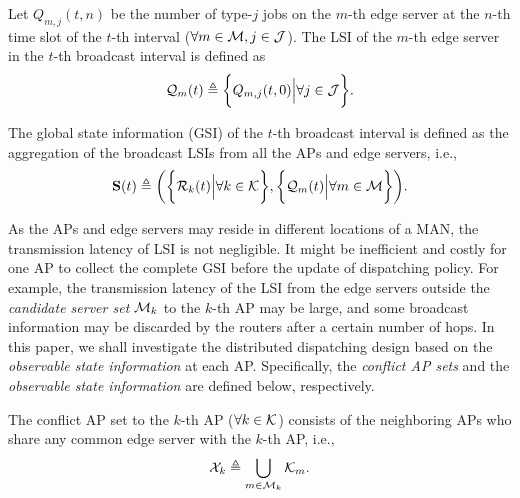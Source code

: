 \begin{definition}
    Let $Q_{m,j}({t,n})$ be the number of type-$j$ jobs on the $m$-th edge server at the $n$-th time slot of the $t$-th interval ($\forall m\in\mathcal{M}, j\in\mathcal{J}$).
    The LSI of the $m$-th edge server in the $t$-th broadcast interval is defined as
    \begin{align}
        \mathcal{Q}_{m}(t) \triangleq \bigg\{
            Q_{m,j}(t, 0) \Big| \forall j\in\mathcal{J}
        \bigg\}.
    \end{align}
\end{definition}

\begin{definition}
    The global state information (GSI) of the $t$-th broadcast interval is defined as the aggregation of the broadcast LSIs from all the APs and edge servers, i.e.,
    \begin{align}
        \mathbf{S}(t) \triangleq
            \bigg(
                \bigg\{\mathcal{R}_{k}(t) \Big| \forall k\in\mathcal{K}\bigg\},
                \bigg\{\mathcal{Q}_{m}(t) \Big| \forall m\in\mathcal{M}\bigg\}
            \bigg).
    \end{align}
\end{definition}

As the APs and edge servers may reside in different locations of a MAN, the transmission latency of LSI is not negligible.
It might be inefficient {and costly} for one AP to collect the complete GSI before the update of dispatching policy.
For example, the transmission latency of the LSI from the edge servers outside the \emph{candidate server set} $\mathcal{M}_{k}$ to the $k$-th AP may be large, and some broadcast information may be discarded by the routers after a certain number of hops.
In this paper, we shall investigate the distributed dispatching design based on the \emph{observable state information} at each AP.
Specifically, the \emph{conflict AP sets} and the \emph{observable state information} are defined below, respectively.
\begin{definition}
    The conflict AP set to the $k$-th AP ($\forall k\in\mathcal{K}$) consists of the neighboring APs who share any common edge server with the $k$-th AP, i.e.,
    \begin{align}
        \mathcal{X}_{k} \triangleq \bigcup_{m\in\mathcal{M}_{k}} \mathcal{K}_{m}.
    \end{align}
\end{definition}


